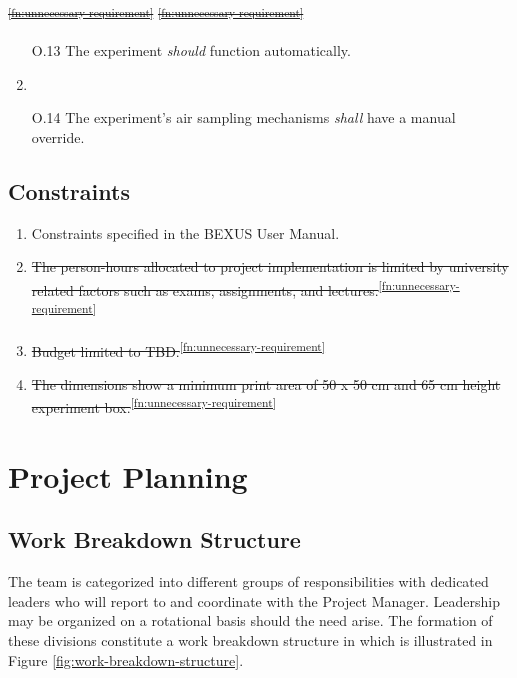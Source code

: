 \documentclass[a4paper,12pt,twoside]{article}
\providecommand{\DIFdeltex}[1]{{\protect\color{red}\sout{#1}}}                      %
\providecommand{\DIFaddbegin}{} %
\providecommand{\DIFaddend}{} %
\providecommand{\DIFdelbegin}{} %
\providecommand{\DIFdelend}{} %
\providecommand{\DIFdel}[1]{\texorpdfstring{\DIFdeltex{#1}}{}} %
\newcommand{\DIFscaledelfig}{0.5}
\newlength{\DIFdelgraphicswidth} %
\newlength{\DIFdelgraphicsheight} %
\newcommand{\DIFaddincludegraphics}[2][]{{\color{blue}\fbox{\DIFOincludegraphics[#1]{#2}}}} %
\newcommand{\DIFdelincludegraphics}[2][]{%
\sbox{\DIFdelgraphicsbox}{\DIFOincludegraphics[#1]{#2}}%
\settoboxwidth{\DIFdelgraphicswidth}{\DIFdelgraphicsbox} %
\settoboxtotalheight{\DIFdelgraphicsheight}{\DIFdelgraphicsbox} %
\scalebox{\DIFscaledelfig}{%
\parbox[b]{\DIFdelgraphicswidth}{\usebox{\DIFdelgraphicsbox}\\[-\baselineskip] \rule{\DIFdelgraphicswidth}{0em}}\llap{\resizebox{\DIFdelgraphicswidth}{\DIFdelgraphicsheight}{%
\setlength{\unitlength}{\DIFdelgraphicswidth}%
\begin{picture}(1,1)%
\thicklines\linethickness{2pt} %
{\color[rgb]{1,0,0}\put(0,0){\framebox(1,1){}}}%
{\color[rgb]{1,0,0}\put(0,0){\line( 1,1){1}}}%
{\color[rgb]{1,0,0}\put(0,1){\line(1,-1){1}}}%
\end{picture}%
}\hspace*{3pt}}} %
} %
\DeclareRobustCommand{\DIFaddbegin}{\DIFOaddbegin \let\includegraphics\DIFaddincludegraphics} %
\DeclareRobustCommand{\DIFaddend}{\DIFOaddend \let\includegraphics\DIFOincludegraphics} %
\DeclareRobustCommand{\DIFdelbegin}{\DIFOdelbegin \let\includegraphics\DIFdelincludegraphics} %
\DeclareRobustCommand{\DIFdelend}{\DIFOaddend \let\includegraphics\DIFOincludegraphics} %
\begin{document}
\DIFdel{\textsuperscript{\ref{fn:unnecessary-requirement}}
    }%
\DIFdel{\textsuperscript{\ref{fn:unnecessary-requirement}}
    }%
\DIFdelend \DIFaddbegin \begin{enumerate}
    \item[O.13] \DIFaddend The experiment \textit{should} function automatically.
    \DIFdelbegin %
\item%
\DIFdelend \DIFaddbegin \item[O.14] \DIFaddend The experiment's air sampling mechanisms \textit{shall} have a manual override.
\end{enumerate} 
\pagebreak
\subsection{Constraints}

\begin{enumerate}[label=C.\arabic*]
    \item Constraints specified in the BEXUS User Manual.
    \item \st{The person-hours allocated to project implementation is limited by university related factors such as exams, assignments, and lectures.}\textsuperscript{\ref{fn:unnecessary-requirement}}
    \item \st{Budget limited to TBD.}\textsuperscript{\ref{fn:unnecessary-requirement}}
    \item \st{The dimensions show a minimum print area of 50 x 50 cm and 65 cm height experiment box.}\textsuperscript{\ref{fn:unnecessary-requirement}}
\end{enumerate}



\pagebreak
\section{Project Planning}

\subsection{Work Breakdown Structure}

The team is categorized into different groups of responsibilities with dedicated leaders who will report to and coordinate with the Project Manager. Leadership may be organized on a rotational basis should the need arise. The formation of these divisions constitute a work breakdown structure in which is illustrated in Figure \ref{fig:work-breakdown-structure}.
\end{document}
